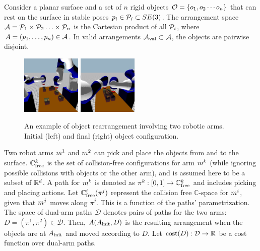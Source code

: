 Consider a planar surface and a set of $n$ rigid objects $ \mathcal{O}=\{ o_1, o_2 \cdots o_n\}$  that can rest on the surface in stable poses $p_i \in \mathcal{P}_i \subset SE(3)$. The arrangement space $ \mathcal{A} = \mathcal{P}_1 \times \mathcal{P}_2 \ldots \times \mathcal{P}_n $ is the Cartesian product of all $\mathcal{P}_i$, where $ A = (p_1, \ldots, p_n) \in \mathcal{A} $. In valid arrangements $ \mathcal{A}_{\rm val} \subset \mathcal{A}$, the objects are pairwise disjoint.

\begin{figure}
	\centering
	\includegraphics[width=1.115in,trim={10cm 3cm 8cm 12cm},clip]{figures/rearrangement_start}
	\includegraphics[width=1.115in,trim={10cm 3cm 8cm 12cm},clip]{figures/rearrangement_end}
	\caption{An example of object rearrangement involving two robotic arms. Initial (left) and final (right) object configuration.}
	\label{fig:rearrangement}
\end{figure}
Two robot arms $m^1$ and $m^2$ can 
pick and place the objects from and to the surface.
$\mathbb{C}_{{\rm free}}^k$ is the set of collision-free configurations for arm $m^k$ (while ignoring possible collisions with  objects or the other arm), and is assumed here to be a subset of $\mathbb{R}^d $.
A path for $m^k$ is denoted as $ \pi^k : [0,1] \rightarrow \mathbb{C}_{{\rm free}}^k$ and includes picking and placing actions.  Let $ \mathbb{C}_{{\rm free}}^i(\pi^j) $ represent the collision free $\mathbb{C}$-space for $m^i$, given that $m^j$ moves along $\pi^j $. This is a function of the paths' parametrization. The space of dual-arm paths $\mathcal{D}$ denotes pairs of paths for the two arms: $D = (\pi^1,\pi^2) \in \mathcal{D}$. Then, $A(A_{\rm init}, D)$ is the resulting arrangement when the objects are at $A_{\rm init}$ and moved according to $D$.   Let $ \textup{cost}(D) : \mathcal{D} \rightarrow \mathbb{R} $ be a cost function over dual-arm paths. 

